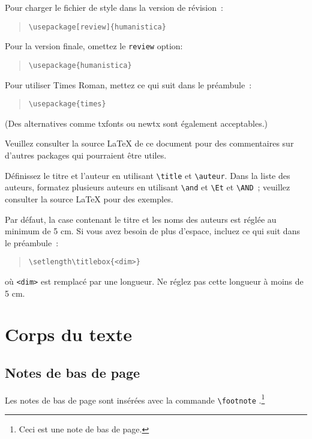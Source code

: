 \documentclass[11pt,french]{article}
\begin{document}
Pour charger le fichier de style dans la version de révision :
\begin{quote}
\begin{verbatim}
\usepackage[review]{humanistica}
\end{verbatim}
\end{quote}
Pour la version finale, omettez le \verb|review| option:
\begin{quote}
\begin{verbatim}
\usepackage{humanistica}
\end{verbatim}
\end{quote}

Pour utiliser Times Roman, mettez ce qui suit dans le préambule :
\begin{quote}
\begin{verbatim}
\usepackage{times}
\end{verbatim}
\end{quote}
(Des alternatives comme txfonts ou newtx sont également acceptables.)

Veuillez consulter la source \LaTeX{} de ce document pour des commentaires sur d'autres packages qui pourraient être utiles.

Définissez le titre et l'auteur en utilisant \verb|\title| et \verb|\auteur|. Dans la liste des auteurs, formatez plusieurs auteurs en utilisant \verb|\and| et \verb|\Et| et \verb|\AND| ; veuillez consulter la source \LaTeX{} pour des exemples.

Par défaut, la case contenant le titre et les noms des auteurs est réglée au minimum de 5 cm. Si vous avez besoin de plus d'espace, incluez ce qui suit dans le préambule :
\begin{quote}
\begin{verbatim}
\setlength\titlebox{<dim>}
\end{verbatim}
\end{quote}
où \verb|<dim>| est remplacé par une longueur. Ne réglez pas cette longueur à moins de 5 cm.

\section{Corps du texte}

\subsection{Notes de bas de page}

Les notes de bas de page sont insérées avec la commande \verb|\footnote| .\footnote{Ceci est une note de bas de page.}
\end{document}
